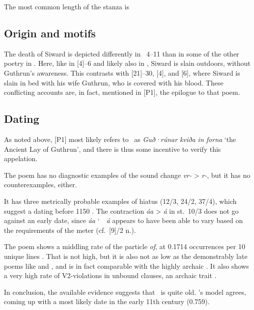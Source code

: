 The most common length of the stanza is

\subsection{Origin and motifs}

The death of Siward is depicted differently in \GudrunTwo\ 4--11 than in some of the other poetry in \Regius.  Here, like in [4]--6 and likely also in , Siward is slain outdoors, without Guthrun’s awareness.  This contrasts with [21]--30, [4], and [6], where Siward is slain in bed with his wife Guthrun, who is covered with his blood.  These conflicting accounts are, in fact, mentioned in [P1], the epilogue to that poem.

\subsection{Dating}

As noted above, [P1] most likely refers to \GudrunTwo\ as \emph{Guð·rúnar kviða in forna} ‘the Ancient Lay of Guthrun’, and there is thus some incentive to verify this appelation.

The poem has no diagnostic examples of the sound change \emph{vr-} > \emph{r-}, but it has no counterexamples, either.

It has three metrically probable examples of hiatus (12/3, 24/2, 37/4), which suggest a dating before 1150 \ce.  The contraction \emph{áa} > \emph{á} in st.~10/3 does not go against an early date, since \emph{áa} \char`~\ \emph{á} appears to have been able to vary based on the requirements of the meter (cf.~[9]/2 n.).

The poem shows a middling rate of the particle \emph{of}, at 0.1714 occurrences per 10 unique lines \parencite[70]{Sapp2022}.  That is not high, but it is also not as low as the demonstrably late poems like  and , and is in fact comparable with the highly archaic .  It also shows a very high rate of V2-violations in unbound clauses, an archaic trait \parencite[246--248, 255]{Haukur2012}.

In conclusion, the available evidence suggests that \GudrunTwo\ is quite old.  \textcite[185]{Sapp2022}’s model agrees, coming up with a most likely date in the early 11th century (0.759).

